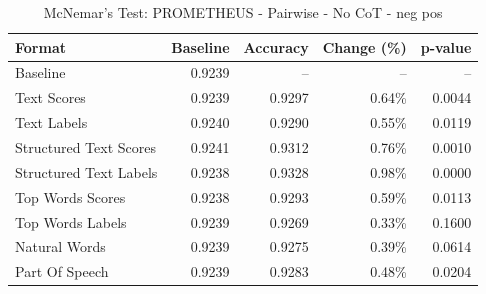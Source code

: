\begin{table}[htbp]
\centering
\caption{McNemar's Test: PROMETHEUS - Pairwise - No CoT - neg pos}
\label{tab:prometheus-pairwise-no_chain_of_thought-neg_pos}
\begin{tabular}{lrrrr}
\toprule
Format & Baseline & Accuracy & Change (\%) & p-value \\
\midrule
Baseline & 0.9239 & -- & -- & -- \\
Text Scores & 0.9239 & 0.9297 & 0.64\% & 0.0044 \\
Text Labels & 0.9240 & 0.9290 & 0.55\% & 0.0119 \\
Structured Text Scores & 0.9241 & 0.9312 & 0.76\% & 0.0010 \\
Structured Text Labels & 0.9238 & 0.9328 & 0.98\% & 0.0000 \\
Top Words Scores & 0.9238 & 0.9293 & 0.59\% & 0.0113 \\
Top Words Labels & 0.9239 & 0.9269 & 0.33\% & 0.1600 \\
Natural Words & 0.9239 & 0.9275 & 0.39\% & 0.0614 \\
Part Of Speech & 0.9239 & 0.9283 & 0.48\% & 0.0204 \\
\bottomrule
\end{tabular}
\end{table}